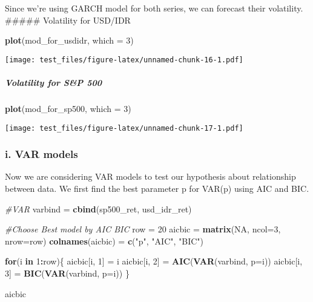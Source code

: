 \documentclass[]{article}
\newenvironment{Shaded}{\begin{snugshade}}{\end{snugshade}}
\newcommand{\KeywordTok}[1]{\textcolor[rgb]{0.13,0.29,0.53}{\textbf{#1}}}
\newcommand{\DataTypeTok}[1]{\textcolor[rgb]{0.13,0.29,0.53}{#1}}
\newcommand{\DecValTok}[1]{\textcolor[rgb]{0.00,0.00,0.81}{#1}}
\newcommand{\StringTok}[1]{\textcolor[rgb]{0.31,0.60,0.02}{#1}}
\newcommand{\CommentTok}[1]{\textcolor[rgb]{0.56,0.35,0.01}{\textit{#1}}}
\newcommand{\OtherTok}[1]{\textcolor[rgb]{0.56,0.35,0.01}{#1}}
\newcommand{\ControlFlowTok}[1]{\textcolor[rgb]{0.13,0.29,0.53}{\textbf{#1}}}
\newcommand{\OperatorTok}[1]{\textcolor[rgb]{0.81,0.36,0.00}{\textbf{#1}}}
\newcommand{\NormalTok}[1]{#1}
\let\oldsubparagraph\subparagraph
\renewcommand{\subparagraph}[1]{\oldsubparagraph{#1}\mbox{}}
\begin{document}
Since we're using GARCH model for both series, we can forecast their
volatility. \#\#\#\#\# Volatility for USD/IDR

\begin{Shaded}
\begin{Highlighting}[]
\KeywordTok{plot}\NormalTok{(mod_for_usdidr, }\DataTypeTok{which =} \DecValTok{3}\NormalTok{)}
\end{Highlighting}
\end{Shaded}

\texttt{[image: test\_files/figure-latex/unnamed-chunk-16-1.pdf]}

\subparagraph{Volatility for S\&P 500}\label{volatility-for-sp-500}

\begin{Shaded}
\begin{Highlighting}[]
\KeywordTok{plot}\NormalTok{(mod_for_sp500, }\DataTypeTok{which =} \DecValTok{3}\NormalTok{)}
\end{Highlighting}
\end{Shaded}

\texttt{[image: test\_files/figure-latex/unnamed-chunk-17-1.pdf]}

\subsubsection{i. VAR models}\label{i.-var-models}

Now we are considering VAR models to test our hypothesis about
relationship between data. We first find the best parameter p for VAR(p)
using AIC and BIC.

\begin{Shaded}
\begin{Highlighting}[]
\CommentTok{#VAR}
\NormalTok{varbind =}\StringTok{ }\KeywordTok{cbind}\NormalTok{(sp500_ret, usd_idr_ret)}

\CommentTok{#Choose Best model by AIC BIC}
\NormalTok{row =}\StringTok{ }\DecValTok{20}
\NormalTok{aicbic =}\StringTok{ }\KeywordTok{matrix}\NormalTok{(}\OtherTok{NA}\NormalTok{, }\DataTypeTok{ncol=}\DecValTok{3}\NormalTok{, }\DataTypeTok{nrow=}\NormalTok{row)}
\KeywordTok{colnames}\NormalTok{(aicbic) =}\StringTok{ }\KeywordTok{c}\NormalTok{(}\StringTok{"p"}\NormalTok{, }\StringTok{"AIC"}\NormalTok{, }\StringTok{"BIC"}\NormalTok{)}

\ControlFlowTok{for}\NormalTok{(i }\ControlFlowTok{in} \DecValTok{1}\OperatorTok{:}\NormalTok{row)\{}
\NormalTok{  aicbic[i, }\DecValTok{1}\NormalTok{] =}\StringTok{ }\NormalTok{i}
\NormalTok{  aicbic[i, }\DecValTok{2}\NormalTok{] =}\StringTok{ }\KeywordTok{AIC}\NormalTok{(}\KeywordTok{VAR}\NormalTok{(varbind, }\DataTypeTok{p=}\NormalTok{i))}
\NormalTok{  aicbic[i, }\DecValTok{3}\NormalTok{] =}\StringTok{ }\KeywordTok{BIC}\NormalTok{(}\KeywordTok{VAR}\NormalTok{(varbind, }\DataTypeTok{p=}\NormalTok{i))}
\NormalTok{\}}

\NormalTok{aicbic}
\end{Highlighting}
\end{Shaded}
\end{document}
